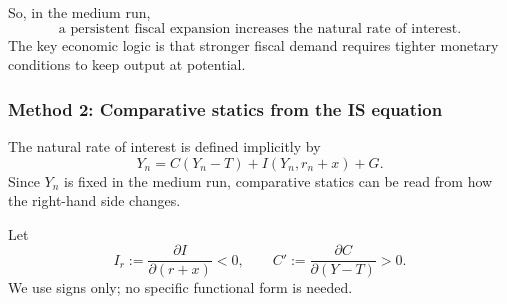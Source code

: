 \documentclass[12pt]{article}
\begin{document}
\begin{enumerate}[label=(\alph*)]
    So, in the medium run,
    \[
    \boxed{\text{a persistent fiscal expansion increases the natural rate of interest.}}
    \]
    The key economic logic is that stronger fiscal demand requires tighter monetary conditions to keep output at potential.
\end{enumerate}

\subsubsection{Method 2: Comparative statics from the IS equation}
The natural rate of interest is defined implicitly by
\[
Y_n=C(Y_n-T)+I(Y_n,r_n+x)+G.
\]
Since \(Y_n\) is fixed in the medium run, comparative statics can be read from how the right-hand side changes.

Let
\[
I_r:=\frac{\partial I}{\partial (r+x)}<0,
\qquad
C' := \frac{\partial C}{\partial (Y-T)}>0.
\]
We use signs only; no specific functional form is needed.
\end{document}
